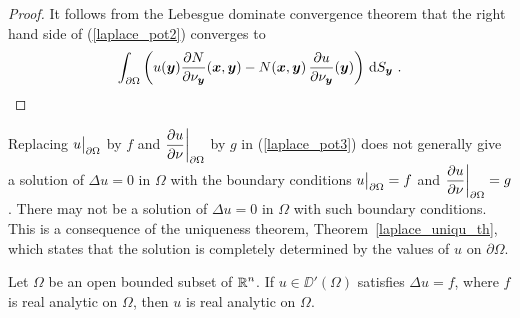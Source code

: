 \begin{proof}
It follows from the Lebesgue dominate convergence theorem that the
right hand side of (\ref{laplace_pot2}) converges to
\[
\int_{\partial \Omega} \left( u({\bm{y}})
\frac{\partial{N}}{\partial \nu_{{\bm{y}}}}({\bm{x}},{\bm{y}}) - N({\bm{x}},{\bm{y}}) \,
\frac{\partial{u}}{\partial \nu_{{\bm{y}}}}({\bm{y}})\right) \,\mathrm{d}{S}_{{\bm{y}}} \ .
\]
\end{proof}

\begin{rmk}
Replacing $\displaystyle u\big|_{\partial \Omega}$ by $f$ and
$\displaystyle \frac{\partial{u}}{\partial \nu}\bigg|_{\partial \Omega}$ by $g$
in (\ref{laplace_pot3}) does not generally give a solution of
$\Delta u = 0$ in $\Omega$ with the boundary conditions
$\displaystyle u\big|_{\partial \Omega} = f$ and
$\displaystyle \frac{\partial{u}}{\partial \nu}\bigg|_{\partial \Omega} = g$.
There may not be a solution of $\Delta u = 0$ in $\Omega$ with such
boundary conditions.  This is a consequence of the uniqueness theorem,
Theorem~\ref{laplace_uniqu_th}, which states that the solution is
completely determined by the values of $u$ on $\partial \Omega$.
\end{rmk}

\begin{cor}
Let $\Omega$ be an open bounded subset of $\displaystyle \mathbb{R}^n$.  If
$u\in \DD'(\Omega)$ satisfies $\Delta u = f$, where $f$ is real
analytic on $\Omega$, then $u$ is real analytic on $\Omega$.
\end{cor}

